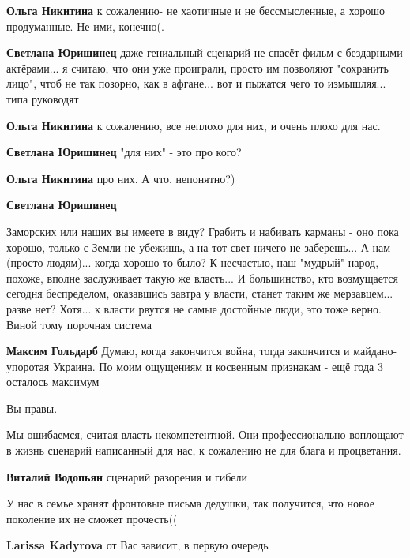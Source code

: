 \begin{itemize}
\begin{itemize}
\textbf{Ольга Никитина} к сожалению- не хаотичные и не бессмысленные, а хорошо продуманные. Не ими, конечно(.

\textbf{Светлана Юришинец} даже гениальный сценарий не спасёт фильм с бездарными актёрами... я считаю, что они уже проиграли, просто им позволяют "сохранить лицо", чтоб не так позорно, как в афгане... вот и пыжатся чего то измышляя... типа руководят

\textbf{Ольга Никитина} к сожалению, все неплохо для них, и очень плохо для нас.

\textbf{Светлана Юришинец} "для них" - это про кого?

\textbf{Ольга Никитина} про них. А что, непонятно?)

\textbf{Светлана Юришинец} 

Заморских или наших вы имеете в виду? Грабить и набивать карманы - оно пока
хорошо, только с Земли не убежишь, а на тот свет ничего не заберешь... А нам
(просто людям)... когда хорошо то было? К несчастью, наш "мудрый" народ,
похоже, вполне заслуживает такую же власть... И большинство, кто возмущается
сегодня беспределом, оказавшись завтра у власти, станет таким же мерзавцем...
разве нет? Хотя... к власти рвутся не самые достойные люди, это тоже верно.
Виной тому порочная система

\textbf{Максим Гольдарб} Думаю, когда закончится война, тогда закончится и
майдано-упоротая Украина. По моим ощущениям и косвенным признакам - ещё года 3
осталось максимум
\end{itemize} %

Вы правы.

Мы ошибаемся, считая власть некомпетентной. Они профессионально воплощают в
жизнь сценарий написанный для нас, к сожалению не для блага и процветания.

\begin{itemize} %
\textbf{Виталий Водопьян} сценарий разорения и гибели
\end{itemize} %


У нас в семье хранят фронтовые письма дедушки, так получится, что новое
поколение их не сможет прочесть((

\begin{itemize} %
\textbf{Larissa Kadyrova} от Вас зависит, в первую очередь
\end{itemize} %


\end{itemize}

